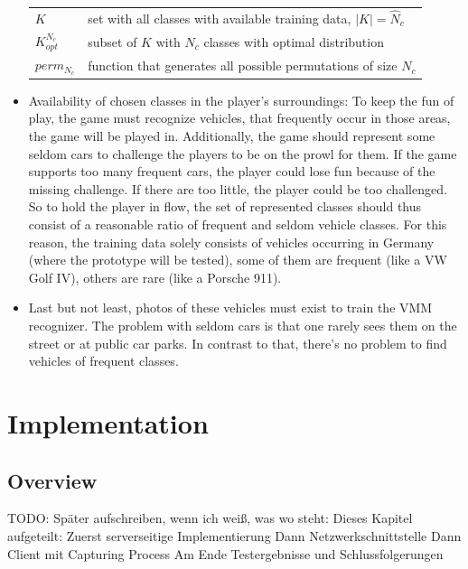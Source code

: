 \begin{itemize}
  \begin{tabular}{ll}
  $K$                     & set with all classes with available training data, $|K| = \hat N_c$ \\
  $K_{opt}^{N_c}$         & subset of $K$ with $N_c$ classes with optimal distribution \\
  $perm_{N_c}$            & function that generates all possible permutations of size $N_c$ \\
  \end{tabular}
  \item Availability of chosen classes in the player's surroundings: To keep the fun of play, the game must recognize vehicles, that frequently occur in those areas, the game will be played in. Additionally, the game should represent some seldom cars to challenge the players to be on the prowl for them. If the game supports too many frequent cars, the player could lose fun because of the missing challenge. If there are too little, the player could be too challenged. So to hold the player in flow, the set of represented classes should thus consist of a reasonable ratio of frequent and seldom vehicle classes. For this reason, the training data solely consists of vehicles occurring in Germany (where the prototype will be tested), some of them are frequent (like a VW Golf IV), others are rare (like a Porsche 911).
  \item Last but not least, photos of these vehicles must exist to train the VMM recognizer. The problem with seldom cars is that one rarely sees them on the street or at public car parks. In contrast to that, there's no problem to find vehicles of frequent classes.
\end{itemize}







\chapter{Implementation}\label{ch:implementation}
\section{Overview}
TODO: Später aufschreiben, wenn ich weiß, was wo steht: Dieses Kapitel aufgeteilt: Zuerst serverseitige Implementierung
Dann Netzwerkschnittstelle
Dann Client mit Capturing Process
Am Ende Testergebnisse und Schlussfolgerungen

